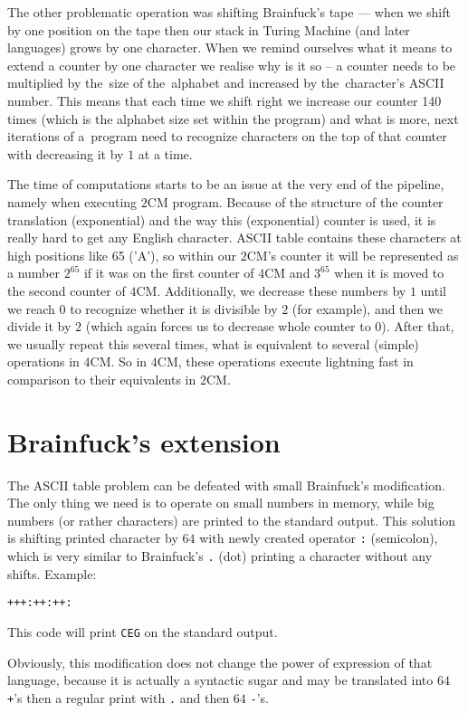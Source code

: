 \documentclass[english,shortabstract,mgr]{iithesis}
\begin{document}
The other problematic operation was shifting Brainfuck's tape --- when we shift
by one position on the tape then our stack in Turing Machine (and later languages)
grows by one character. When we remind ourselves what it means to extend a counter by
one character we realise why is it so -- a counter needs to be multiplied by
the~size of the~alphabet and increased by the~character's ASCII number.
This means that each time we shift right we increase our counter 140 times
(which is the alphabet size set within the program) and what is more, next
iterations of a~program need to recognize characters on the top of that
counter with decreasing it by $1$ at a time.

The time of computations starts to be an issue at the very end of the pipeline, namely
when executing $2$CM program. Because of the structure of the counter translation
(exponential) and the way this (exponential) counter is used, it is really
hard to get any English character. ASCII table contains these characters
at high positions like 65 ('A'), so within our $2$CM's counter it will be represented
as a number $2^{65}$ if it was on the first counter of $4$CM and $3^{65}$ when
it is moved to the second counter of $4$CM. Additionally, we decrease these numbers
by $1$ until we reach $0$ to recognize whether it is divisible by $2$ (for example),
and then we divide it by $2$ (which again forces us to decrease whole counter to $0$).
After that, we usually repeat this several times, what is equivalent to several
(simple) operations in $4$CM. So in $4$CM, these operations execute lightning fast
in comparison to their equivalents in $2$CM.

\section{Brainfuck's extension}

The ASCII table problem can be defeated with small Brainfuck's modification. The only thing we need
is to operate on small numbers in memory, while big numbers (or rather characters) are printed to the standard output.
This solution is shifting printed character by $64$ with newly created operator \texttt{:} (semicolon),
which is very similar to Brainfuck's \texttt{.} (dot) printing a character without any shifts. Example:
\begin{verbatim}
+++:++:++:
\end{verbatim}
This code will print \texttt{CEG} on the standard output.

Obviously, this modification does not change the power of expression
of that language, because it is actually a syntactic sugar and may be translated
into $64$ \texttt{+}'s then a regular print with \texttt{.} and then $64$ \texttt{-}'s.
\end{document}
